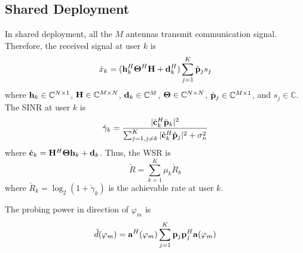 \subsection{Shared Deployment}

In shared deployment, all the $M$ antennas transmit communication signal. Therefore, the received signal at user $k$ is
\begin{equation}
    \check{x}_k = ({\bf h}_k^H {\bf \Theta}^H {\bf H} + {\bf d}_k^H) \sum_{j=1}^K \check{\bf p}_j s_j
\end{equation}
where ${\bf h}_k \in \mathbb{C}^{N \times 1}$, ${\bf H} \in \mathbb{C}^{M \times N}$, ${\bf d}_k \in \mathbb{C}^{M \time 1}$, 
${\bf \Theta} \in \mathbb{C}^{N \times N}$, $\check{\bf p}_j \in \mathbb{C}^{M \times 1}$, and $s_j \in \mathbb{C}$. 
The SINR at user $k$ is
\begin{equation}
    \check{\gamma}_k = \frac{|\check{\bf c}_k^H \check{\bf p}_k|^2}{\sum_{j=1,j\neq k}^K |\check{\bf c}_k^H \check{\bf p}_j|^2 + \sigma_n^2}
\end{equation}
where $\check{\bf c}_k = {\bf H}^H {\bf \Theta} {\bf h}_k + {\bf d}_k$. Thus, the WSR is
\begin{equation}
    \check{R} = \sum_{k=1}^K \mu_k \check{R}_k
\end{equation}
where $\check{R}_k = \log_2(1+\check{\gamma}_k)$ is the achievable rate at user $k$.

The probing power in direction of $\varphi_m$ is
\begin{equation}
    \check{d}(\varphi_m) = {\bf a}^H(\varphi_m) \sum_{j=1}^K {\bf p}_j {\bf p}_j^H {\bf a}(\varphi_m)
\end{equation}